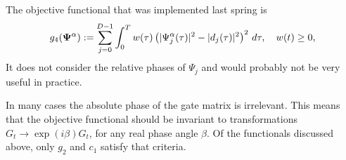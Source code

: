 \documentclass[11pt]{article}
\begin{document}
The objective functional that was implemented last spring is
\[
g_4({\mathbf \Psi}^\alpha) := \sum_{j=0}^{D-1} \int_0^T w(\tau)  \left( |\Psi^\alpha_j(\tau)|^2 - |d_j(\tau)|^2 \right)^2\,
d\tau,\quad w(t) \geq 0,
\]
It does not consider the relative phases of $\Psi_j$ and would probably not be very useful in practice.

\begin{remark}
In many cases the absolute phase of the gate matrix is irrelevant. This means that the
objective functional should be invariant to transformations $G_t \to \exp(i\beta) G_t$, for any real
phase angle $\beta$. Of the functionals discussed above, only $g_2$ and $c_1$ satisfy that criteria.
\end{remark}
\end{document}
